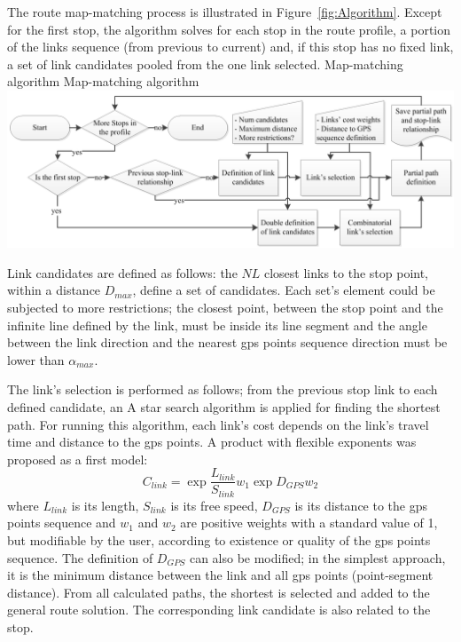 The route map-matching process is illustrated in Figure~\ref{fig:Algorithm}. Except for the first stop, the algorithm solves for each stop in the route profile, a portion of the links sequence (from previous to current) and, if this stop has no fixed link, a set of link candidates pooled from the one link selected.
%
\createfigure
{Map-matching algorithm}
{Map-matching algorithm}
{\label{fig:Algorithm}}
{\includegraphics[width=1.0\textwidth]{extending/figures/semiAuto/Algorithm.png}}
{}

Link candidates are defined as follows: the $NL$ closest links to the stop point, within a distance $D_{max}$, define a set of candidates. Each set's element could be subjected to more restrictions; the closest point, between the stop point and the infinite line defined by the link, must be inside its line segment and the angle between the link direction and the nearest \gls{gps} points sequence direction must be lower than $\alpha_{max}$.

The link's selection is performed as follows; from the previous stop link to each defined candidate, an A star search algorithm is applied for finding the shortest path. For running this algorithm, each link's cost depends on the link's travel time and distance to the \gls{gps} points. A product with flexible exponents was proposed as a first model:
%
\begin{equation}
\label{eq:LinkCost}
	C_{link} = \exp{\frac{L_{link}}{S_{link}}}{w_{1}}\exp{D_{GPS}}{w_{2}}
\end{equation}
%
where $L_{link}$ is its length, $S_{link}$ is its free speed, $D_{GPS}$ is its distance to the \gls{gps} points sequence and $w_{1}$ and $w_{2}$ are positive weights with a standard value of 1, but modifiable by the user, according to existence or quality of the \gls{gps} points sequence. The definition of $D_{GPS}$ can also be modified; in the simplest approach, it is the minimum distance between the link and all \gls{gps} points (point-segment distance). From all calculated paths, the shortest is selected and added to the general route solution. The corresponding link candidate is also related to the stop. 

